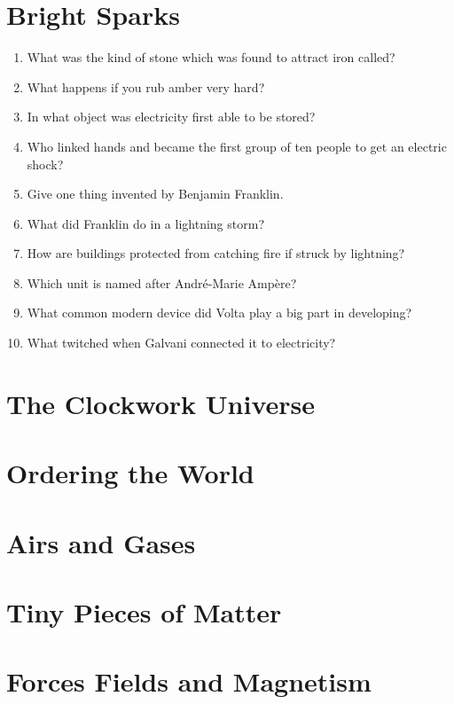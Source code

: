 \documentclass[a4paper,12pt]{article}
\begin{document}
\section{Bright Sparks} %

\begin{enumerate}
    \item What was the kind of stone which was found to attract iron called?
    \item What happens if you rub amber very hard?
    \item In what object was electricity first able to be stored?
    \item Who linked hands and became the first group of ten people to get an electric shock?
    \item Give one thing invented by Benjamin Franklin.
    \item What did Franklin do in a lightning storm?
    \item How are buildings protected from catching fire if struck by lightning?
    \item Which unit is named after Andr\'e-Marie Amp\`ere?
    \item What common modern device did Volta play a big part in developing?
    \item What twitched when Galvani connected it to electricity?
\end{enumerate}

\section{The Clockwork Universe} %

\section{Ordering the World} %

\section{Airs and Gases} %

\section{Tiny Pieces of Matter} %

\section{Forces Fields and Magnetism} %
\end{document}
